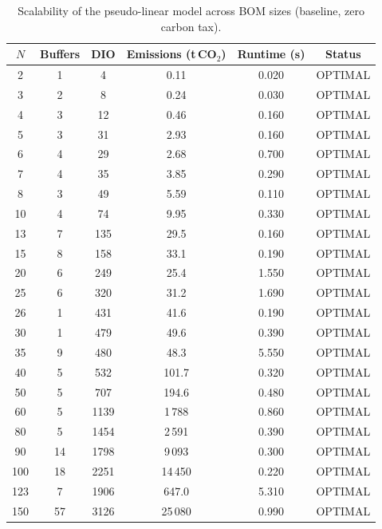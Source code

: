 \begin{table}[!htbp]\centering
\caption{Scalability of the pseudo-linear model across BOM sizes (baseline, zero carbon tax).}\label{tab:scal}
\begin{tabular}{cccccc}
\toprule
$N$ & Buffers & DIO & Emissions (t\,CO$_2$) & Runtime (s) & Status\\
\midrule
2 & 1 & 4 & 0.11 & 0.020 & OPTIMAL \\
3 & 2 & 8 & 0.24 & 0.030 & OPTIMAL \\
4 & 3 & 12 & 0.46 & 0.160 & OPTIMAL \\
5 & 3 & 31 & 2.93 & 0.160 & OPTIMAL \\
6 & 4 & 29 & 2.68 & 0.700 & OPTIMAL \\
7 & 4 & 35 & 3.85 & 0.290 & OPTIMAL \\
8 & 3 & 49 & 5.59 & 0.110 & OPTIMAL \\
10 & 4 & 74 & 9.95 & 0.330 & OPTIMAL \\
13 & 7 & 135 & 29.5 & 0.160 & OPTIMAL \\
15 & 8 & 158 & 33.1 & 0.190 & OPTIMAL \\
20 & 6 & 249 & 25.4 & 1.550 & OPTIMAL \\
25 & 6 & 320 & 31.2 & 1.690 & OPTIMAL \\
26 & 1 & 431 & 41.6 & 0.190 & OPTIMAL \\
30 & 1 & 479 & 49.6 & 0.390 & OPTIMAL \\
35 & 9 & 480 & 48.3 & 5.550 & OPTIMAL \\
40 & 5 & 532 & 101.7 & 0.320 & OPTIMAL \\
50 & 5 & 707 & 194.6 & 0.480 & OPTIMAL \\
60 & 5 & 1139 & 1\,788 & 0.860 & OPTIMAL \\
80 & 5 & 1454 & 2\,591 & 0.390 & OPTIMAL \\
90 & 14 & 1798 & 9\,093 & 0.300 & OPTIMAL \\
100 & 18 & 2251 & 14\,450 & 0.220 & OPTIMAL \\
123 & 7 & 1906 & 647.0 & 5.310 & OPTIMAL \\
150 & 57 & 3126 & 25\,080 & 0.990 & OPTIMAL \\
\bottomrule
\end{tabular}
\end{table}

